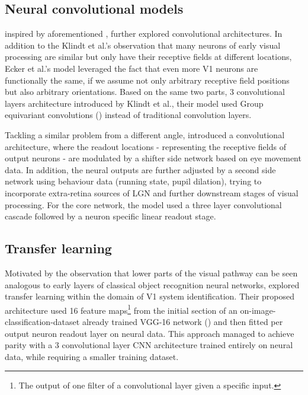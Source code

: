 \subsection{Neural convolutional models}
\cite{ecker} inspired by aforementioned \cite{klidnt}, further explored convolutional architectures. In addition to the Klindt et al.’s observation that many neurons of early visual processing are similar but only have their receptive fields at different locations, Ecker et al.’s model leveraged the fact that even more V1 neurons are functionally the same, if we assume not only arbitrary receptive field positions but also arbitrary orientations. Based on the same two parts, 3 convolutional layers architecture introduced by Klindt et al., their model used Group equivariant convolutions (\cite{2016arXiv160207576C}) instead of traditional convolution layers.

Tackling a similar problem from a different angle, \cite{Walke506956} introduced a convolutional architecture, where the readout locations - representing the receptive fields of output neurons - are modulated by a shifter side network based on eye movement data. In addition, the neural outputs are further adjusted by a second side network using behaviour data (running state, pupil dilation), trying to incorporate extra-retina sources of LGN and further downstream stages of visual processing. For the core network, the model used a three layer convolutional cascade followed by a neuron specific linear readout stage. 

\subsection{Transfer learning}

Motivated by the observation that lower parts of the visual pathway can be seen analogous to early layers of classical object recognition neural networks, \cite{10.1371/journal.pcbi.1006897} explored transfer learning within the domain of V1 system identification. Their proposed architecture used 16 feature maps\footnote{The output of one filter of a convolutional layer given a specific input.} from the initial section of an on-image-classification-dataset already trained VGG-16 network (\cite{VGG16}) and then fitted per output neuron readout layer on neural data. This approach managed to achieve parity with a 3 convolutional layer CNN architecture trained entirely on neural data, while requiring a smaller training dataset.
